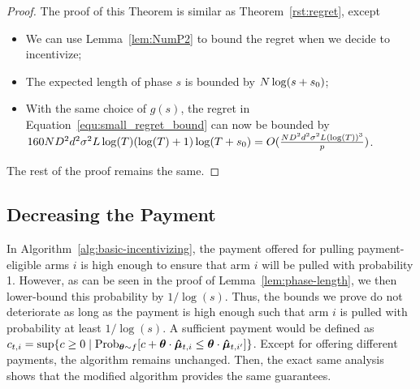 \begin{proof}
The proof of this Theorem is similar as Theorem~\ref{rst:regret}, except
\begin{itemize}
\item We can use Lemma~\ref{lem:NumP2} to bound the regret when we decide to incentivize;
\item The expected length of phase $s$ is bounded by $N \log(s+s_0)$;
\item With the same choice of $g(s)$, the regret in Equation~\ref{equ:small_regret_bound} can now be bounded by $160 ND^2 d^2\sigma^2 L\log(T)(\log(T)+1)\log(T+s_0)=O(\frac{ND^2 d^2\sigma^2 L(\log(T))^3}{p})$.
\end{itemize}
The rest of the proof remains the same.
\end{proof}


\subsection{Decreasing the Payment} \label{sec:pi}

In Algorithm~\ref{alg:basic-incentivizing},
the payment  offered for pulling payment-eligible arms $i$
is high enough to ensure that arm $i$ will be pulled with probability 1.
However, as can be seen in the proof of Lemma~\ref{lem:phase-length},
we then lower-bound this probability by $1/\log(s)$.
Thus, the bounds we prove do not deteriorate as long as the payment is
high enough such that arm $i$ is pulled with probability at least $1/\log(s)$.
A sufficient payment would be defined as
$\Pay{t}{i} = \sup \Set{c \geq 0}{%
  \Prob[\AgV \sim \AgentDist]{c + \AgV \cdot \ArmEV{t}{i} \leq \AgV \cdot \ArmEV{t}{i'}}}$.
Except for offering different payments, the algorithm remains unchanged.
Then, the exact same analysis shows that the modified algorithm
provides the same guarantees.
